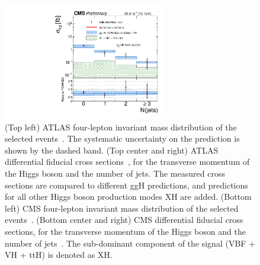 \documentclass[10pt]{article}
\begin{document}
\begin{figure}[htb]
\includegraphics[height=2in]{figures/CMS-HIG-16-041__Figure_009-c__njets.pdf}
\caption{
  (Top left) ATLAS four-lepton invariant mass distribution of the selected
  events~\cite{Aaboud:2017oem}. The systematic uncertainty on the prediction is shown
  by the dashed band. (Top center and right) ATLAS differential fiducial cross
  sections~\cite{Aaboud:2017oem}, for the transverse momentum of the Higgs boson and
  the number of jets.
  The measured cross sections are compared to different ggH predictions, and
  predictions for all other Higgs boson production modes XH are added.
  (Bottom left) CMS four-lepton invariant mass distribution of the selected
  events~\cite{Sirunyan:2017exp}.
  (Bottom center and right) CMS differential fiducial cross sections, for the
  transverse momentum of the Higgs boson and the number of jets~\cite{Sirunyan:2017exp}.
  The sub-dominant component of the signal (VBF + VH + ttH) is denoted as XH.
}
\label{fig:figure-ZZ}
\end{figure}
\end{document}
